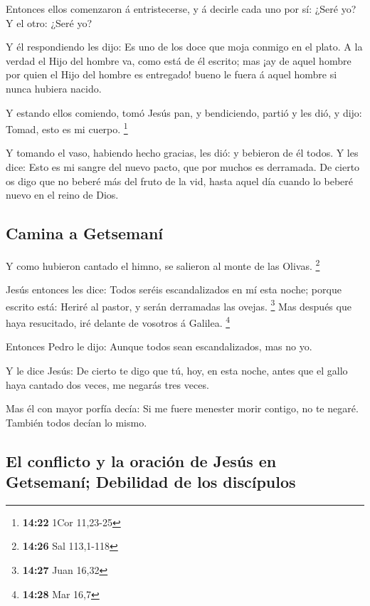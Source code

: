  Entonces ellos comenzaron á entristecerse, y á decirle
cada uno por sí: ¿Seré yo? Y el otro: ¿Seré yo?

 Y él respondiendo les dijo: Es uno de los doce que moja
conmigo en el plato.  A la verdad el Hijo del hombre va,
como está de él escrito; mas ¡ay de aquel hombre por quien el Hijo del
hombre es entregado! bueno le fuera á aquel hombre si nunca hubiera
nacido.

 Y estando ellos comiendo, tomó Jesús pan, y bendiciendo,
partió y les dió, y dijo: Tomad, esto es mi cuerpo. \footnote{\textbf{14:22}
  1Cor 11,23-25}

 Y tomando el vaso, habiendo hecho gracias, les dió: y
bebieron de él todos.  Y les dice: Esto es mi sangre del
nuevo pacto, que por muchos es derramada.  De cierto os
digo que no beberé más del fruto de la vid, hasta aquel día cuando lo
beberé nuevo en el reino de Dios.

\hypertarget{camina-a-getsemanuxed}{%
\subsection{Camina a Getsemaní}\label{camina-a-getsemanuxed}}

 Y como hubieron cantado el himno, se salieron al monte
de las Olivas. \footnote{\textbf{14:26} Sal 113,1-118}

 Jesús entonces les dice: Todos seréis escandalizados en
mí esta noche; porque escrito está: Heriré al pastor, y serán derramadas
las ovejas. \footnote{\textbf{14:27} Juan 16,32}  Mas
después que haya resucitado, iré delante de vosotros á Galilea.
\footnote{\textbf{14:28} Mar 16,7}

 Entonces Pedro le dijo: Aunque todos sean
escandalizados, mas no yo.

 Y le dice Jesús: De cierto te digo que tú, hoy, en esta
noche, antes que el gallo haya cantado dos veces, me negarás tres veces.

 Mas él con mayor porfía decía: Si me fuere menester
morir contigo, no te negaré. También todos decían lo mismo.

\hypertarget{el-conflicto-y-la-oraciuxf3n-de-jesuxfas-en-getsemanuxed-debilidad-de-los-discuxedpulos}{%
\subsection{El conflicto y la oración de Jesús en Getsemaní; Debilidad
de los
discípulos}\label{el-conflicto-y-la-oraciuxf3n-de-jesuxfas-en-getsemanuxed-debilidad-de-los-discuxedpulos}}

